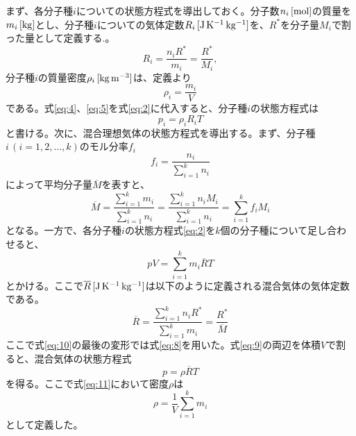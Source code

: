 \documentclass{ltjsarticle}
\begin{document}
まず、各分子種$i$についての状態方程式を導出しておく。分子数$n_{i}\,[\rm{mol}]$の質量を$m_{i}\,[\rm{kg}]$とし、分子種$i$についての気体定数$R_{i}\,[\rm{J\,K^{-1}\,kg^{-1}}]$を、$R^{*}$を分子量$M_{i}$で割った量として定義する.。
\begin{equation}\label{eq:4}
 R_{i}=\frac{n_{i}R^{*}}{m_{i}}=\frac{R^{*}}{M_{i}},
\end{equation}
分子種$i$の質量密度$\rho_{i}\,\rm{[kg\,m^{-3}]}$は、定義より
\begin{equation}\label{eq:5}
 \rho_{i}=\frac{m_{i}}{V}
\end{equation}
である。式\eqref{eq:4}、\eqref{eq:5}を式\eqref{eq:2}に代入すると、分子種$i$の状態方程式は
\begin{equation}\label{eq:6}
 p_{i}=\rho_{i}R_{i}T 
\end{equation}
と書ける。次に、混合理想気体の状態方程式を導出する。まず、分子種$i\,(i = 1,2,\dots, k)$のモル分率$f_{i}$
\begin{equation}\label{eq:7}
 f_{i}=\frac{n_{i}}{\sum_{i=1}^{k}n_{i}} 
\end{equation}
によって平均分子量$\overline{M}$を表すと、
\begin{equation}\label{eq:8}
 \overline{M}=\frac{\sum_{i=1}^{k}m_{i}}{\sum_{i=1}^{k}n_{i}}=\frac{\sum_{i=1}^{k}n_{i}M_{i}}{\sum_{i=1}^{k}n_{i}}=\sum_{i=1}^{k}f_{i}M_{i}
\end{equation}
となる。一方で、各分子種$i$の状態方程式\eqref{eq:2}を$k$個の分子種について足し合わせると、
\begin{equation}\label{eq:9}
 pV=\sum_{i=1}^{k}m_{i}\overline{R}T 
\end{equation}
とかける。ここで$\overline{R}\,[\rm{J\,K^{-1}\,kg^{-1}}]$は以下のように定義される混合気体の気体定数である。
\begin{equation}\label{eq:10}
 \overline{R}=\frac{\sum_{i=1}^{k}n_{i}R^{*}}{\sum_{i=1}^{k}m_{i}}=\frac{R^{*}}{\overline{M}}
\end{equation}
ここで式\eqref{eq:10}の最後の変形では式\eqref{eq:8}を用いた。式\eqref{eq:9}の両辺を体積$V$で割ると、混合気体の状態方程式
\begin{equation}\label{eq:11}
 p=\rho\overline{R}T 
\end{equation}
を得る。ここで式\eqref{eq:11}において密度$\rho$は
\begin{equation}\label{eq:12}
 \rho=\frac{1}{V}\sum_{i=1}^{k}m_{i} 
\end{equation}
として定義した。
\end{document}
